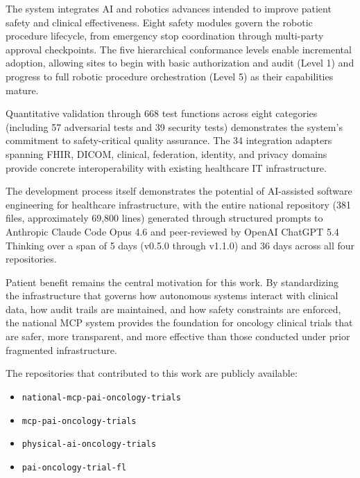 \documentclass{article}
\begin{document}
The system integrates AI and robotics advances intended to improve patient safety and clinical effectiveness. Eight safety modules govern the robotic procedure lifecycle, from emergency stop coordination through multi-party approval checkpoints. The five hierarchical conformance levels enable incremental adoption, allowing sites to begin with basic authorization and audit (Level 1) and progress to full robotic procedure orchestration (Level 5) as their capabilities mature.

Quantitative validation through 668 test functions across eight categories (including 57 adversarial tests and 39 security tests) demonstrates the system's commitment to safety-critical quality assurance. The 34 integration adapters spanning FHIR, DICOM, clinical, federation, identity, and privacy domains provide concrete interoperability with existing healthcare IT infrastructure.

The development process itself demonstrates the potential of AI-assisted software engineering for healthcare infrastructure, with the entire national repository (381 files, approximately 69,800 lines) generated through structured prompts to Anthropic Claude Code Opus 4.6 and peer-reviewed by OpenAI ChatGPT 5.4 Thinking over a span of 5 days (v0.5.0 through v1.1.0) and 36 days across all four repositories.

Patient benefit remains the central motivation for this work. By standardizing the infrastructure that governs how autonomous systems interact with clinical data, how audit trails are maintained, and how safety constraints are enforced, the national MCP system provides the foundation for oncology clinical trials that are safer, more transparent, and more effective than those conducted under prior fragmented infrastructure.

The repositories that contributed to this work are publicly available:
\begin{itemize}[leftmargin=*]
\item \texttt{national-mcp-pai-oncology-trials}~\cite{kawchak2026national}
\item \texttt{mcp-pai-oncology-trials}~\cite{kawchak2026trialmcp}
\item \texttt{physical-ai-oncology-trials}~\cite{kawchak2026physicalai}
\item \texttt{pai-oncology-trial-fl}~\cite{kawchak2026paifl}
\end{itemize}



\end{document}
